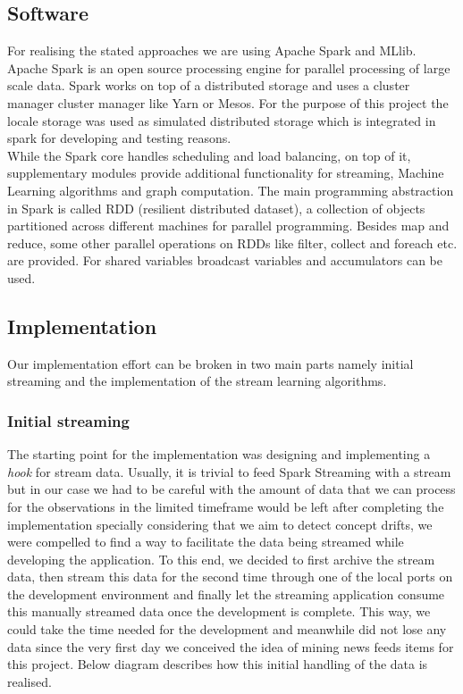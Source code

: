 \documentclass{article} %
\begin{document}
\subsection{Software}
For realising the stated approaches we are using Apache Spark and MLlib. Apache Spark is an open source processing engine for parallel processing of large scale data. Spark works on top of a distributed storage and uses a cluster manager cluster manager like Yarn or Mesos. For the purpose of this project the locale storage was used as simulated distributed storage which is integrated in spark for developing and testing reasons.  \\
While the Spark core handles scheduling and load balancing, on top of it, supplementary modules provide additional functionality for streaming, Machine Learning  algorithms and graph computation. The main programming abstraction in Spark is called RDD (resilient distributed dataset), a collection of objects partitioned across different machines for parallel programming. Besides map and reduce, some other parallel operations on RDDs like filter, collect and foreach etc. are provided. For shared variables broadcast variables and  accumulators can be used.

\subsection{Implementation}

Our implementation effort can be broken in two main parts namely initial streaming and the implementation of the stream learning algorithms.

\subsubsection{Initial streaming}

The starting point for the implementation was designing and implementing a \textit{hook} for stream data. Usually, it is trivial to feed Spark Streaming with a stream but in our case we had to be careful with the amount of data that we can process for the observations in the limited timeframe would be left after completing the implementation  specially considering that we aim to detect concept drifts, we were compelled to find a way to facilitate the data being streamed while developing the application. To this end, we decided to first archive the stream data, then stream this data for the second time through one of the local ports on the development environment and finally let the streaming application consume this manually streamed data once the development is complete. This way, we could take the time needed for the development and meanwhile did not lose any data since the very first day we conceived the idea of mining news feeds items for this project. Below diagram describes how this initial handling of the data is realised. 
\end{document}
